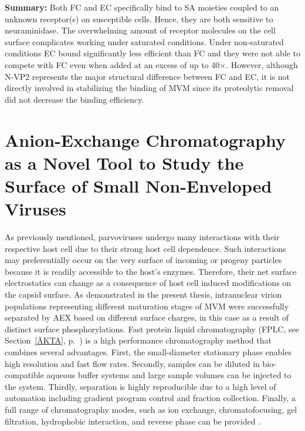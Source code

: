 \medskip
\textbf{Summary:} Both FC and EC specifically bind to SA moieties coupled to an unknown receptor(s) on susceptible cells. Hence, they are both sensitive to neuraminidase. The overwhelming amount of receptor molecules on the cell surface complicates working under saturated conditions. Under non-saturated conditions EC bound significantly less efficient than FC and they were not able to compete with FC even when added at an excess of up to 40$\times$. However, although N-VP2 represents the major structural difference between FC and EC, it is not directly involved in stabilizing the binding of MVM since its proteolytic removal did not decrease the binding efficiency.   



\section[AEX as a Novel Tool to Study the Surface Conformation of Small Non-Enveloped Viruses]{Anion-Exchange Chromatography as a Novel Tool to Study the Surface of Small Non-Enveloped Viruses}


As previously mentioned, parvoviruses undergo many interactions with their respective host cell due to their strong host cell dependence. Such interactions may preferentially occur on the very surface of incoming or progeny particles because it is readily accessible to the host's enzymes. Therefore, their net surface electrostatics can change as a consequence of host cell induced modifications on the capsid surface. As demonstrated in the present thesis, intranuclear virion populations representing different maturation stages of MVM were successfully separated by AEX based on different surface charges, in this case as a result of distinct surface phosphorylations. Fast protein liquid chromatography (FPLC, see Section~\ref{ÄKTA}, p.~\pageref{ÄKTA}) is a high performance chromatography method that combines several advantages. First, the small-diameter stationary phase enables high resolution and fast flow rates. Secondly, samples can be diluted in bio-compatible aqueous buffer systems and large sample volumes can be injected to the system. Thirdly, separation is highly reproducible due to a high level of automation including gradient program control and fraction collection. Finally, a full range of chromatography modes, such as ion exchange, chromatofocusing, gel filtration, hydrophobic interaction, and reverse phase can be provided \cite{pmid20978981}. 

